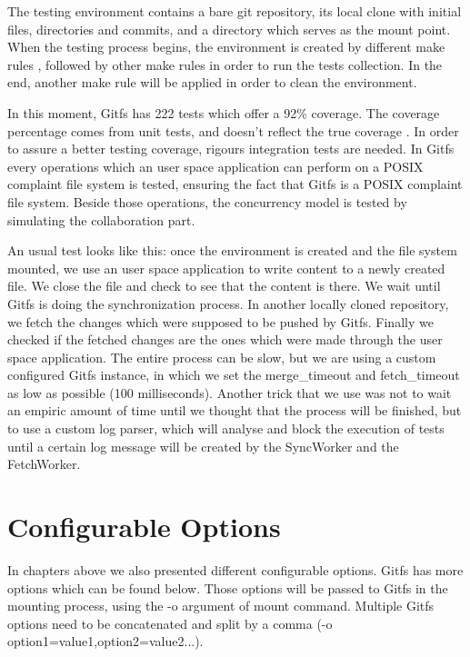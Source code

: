 The testing environment contains a bare git repository, its local clone with initial files, directories and commits, and a directory which serves as the mount point. When the testing process begins, the environment is created by different make rules \cite{Aham-cumming2015}, followed by other make rules in order to run the tests collection. In the end, another make rule will be applied in order to clean the environment.

In this moment, Gitfs has 222 tests which offer a 92\% coverage. The coverage percentage comes from unit tests, and doesn't reflect the true coverage \cite{Inozemtseva2014}. In order to assure a better testing coverage, rigours integration tests are needed. In Gitfs every operations which an user space application can perform on a POSIX complaint file system is tested, ensuring the fact that Gitfs is a POSIX complaint file system. Beside those operations, the concurrency model is tested by simulating the collaboration part.

An usual test looks like this: once the environment is created and the file system mounted, we use an user space application to write content to a newly created file. We close the file and check to see that the content is there. We wait until Gitfs is doing the synchronization process. In another locally cloned repository, we fetch the changes which were supposed to be pushed by Gitfs. Finally we checked if the fetched changes are the ones which were made through the user space application. The entire process can be slow, but we are using a custom configured Gitfs instance, in which we set the merge\_timeout and fetch\_timeout as low as possible (100 milliseconds). Another trick that we use was not to wait an empiric amount of time until we thought that the process will be finished, but to use a custom log parser, which will analyse and block the execution of tests until a certain log message will be created by the SyncWorker and the FetchWorker.

\section{Configurable Options}
In chapters above we also presented different configurable options. Gitfs has more options which can be found below. Those options will be passed to Gitfs in the mounting process, using the -o argument of mount command. Multiple Gitfs options need to be concatenated and split by a comma (-o option1=value1,option2=value2...).

